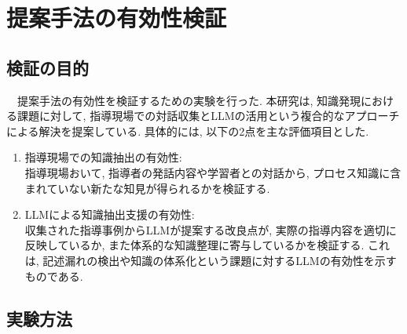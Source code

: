\chapter{提案手法の有効性検証}

\section{検証の目的}
　提案手法の有効性を検証するための実験を行った. 本研究は, 知識発現\cite{Nishimura2017}における課題に対して, 指導現場での対話収集とLLMの活用という複合的なアプローチによる解決を提案している. 具体的には, 以下の2点を主な評価項目とした.\\
\begin{enumerate}
    \item 指導現場での知識抽出の有効性:\\
    指導現場おいて, 指導者の発話内容や学習者との対話から, プロセス知識に含まれていない新たな知見が得られるかを検証する. 
    \item LLMによる知識抽出支援の有効性:\\
    収集された指導事例からLLMが提案する改良点が, 実際の指導内容を適切に反映しているか, また体系的な知識整理に寄与しているかを検証する. これは, 記述漏れの検出や知識の体系化という課題に対するLLMの有効性を示すものである. 
\end{enumerate}


\section{実験方法}
